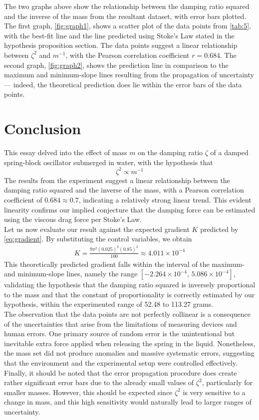 \documentclass[a4paper,12pt]{article}
\newcommand{\lb}{\\[12pt]}
\begin{document}
The two graphs above show the relationship between the damping ratio squared and the inverse of the mass from the resultant dataset, with error bars plotted. The first graph, \cref{fig:graph1}, shows a scatter plot of the data points from \cref{tab:5}, with the best-fit line and the line predicted using Stoke's Law stated in the hypothesis proposition section. The data points suggest a linear relationship between $\zeta^2$ and $m^{-1}$, with the Pearson correlation coefficient $r = 0.684$. The second graph, \cref{fig:graph2}, shows the prediction line in comparison to the maximum and minimum-slope lines resulting from the propagation of uncertainty --- indeed, the theoretical prediction does lie within the error bars of the data points.

\section{Conclusion}

This essay delved into the effect of mass $m$ on the damping ratio $\zeta$ of a damped spring-block oscillator submerged in water, with the hypothesis that $$\zeta^2 \propto m^{-1}$$ The results from the experiment suggest a linear relationship between the damping ratio squared and the inverse of the mass, with a Pearson correlation coefficient of $0.684 \approx 0.7$, indicating a relatively strong linear trend. This evident linearity confirms our implied conjecture that the damping force can be estimated using the viscous drag force per Stoke's Law.\lb
Let us now evaluate our result against the expected gradient $K$ predicted by \cref{eq:gradient}. By substituting the control variables, we obtain
\begin{align*}
  K = \frac{9\pi^2(0.025)^2(0.85)^2}{100} \approx 4.011\times 10^{-4}
\end{align*}
This theoretically predicted gradient falls within the interval of the maximum- and minimum-slope lines, namely the range $\left[-2.264\times 10^{-4},\, 5.086\times 10^{-4}\right]$, validating the hypothesis that the damping ratio squared is inversely proportional to the mass and that the constant of proportionality is correctly estimated by our hypothesis, within the experimented range of 52.48 to 113.27 grams.\lb
The observation that the data points are not perfectly collinear is a consequence of the uncertainties that arise from the limitations of measuring devices and human errors. One primary source of random error is the unintentional but inevitable extra force applied when releasing the spring in the liquid. Nonetheless, the mass set did not produce anomalies and massive systematic errors, suggesting that the environment and the experimental setup were controlled effectively. \lb
Finally, it should be noted that the error propagation procedure does create rather significant error bars due to the already small values of $\zeta^2$, particularly for smaller masses. However, this should be expected since $\zeta^2$ is very sensitive to a change in mass, and this high sensitivity would naturally lead to larger ranges of uncertainty.
\end{document}
